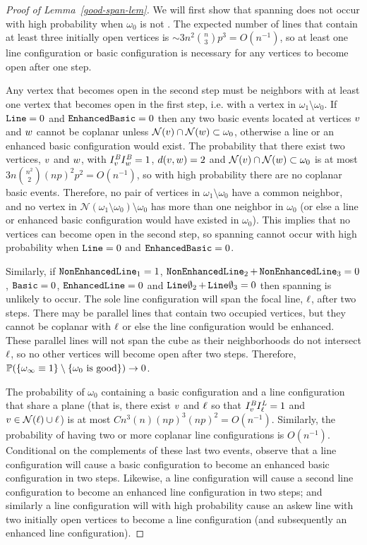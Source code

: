 \begin{proof}[Proof of Lemma~\ref{good-span-lem}]
We will first show that spanning does not occur with high probability when $\omega_0$ is not \good.  The expected number of lines that contain at least three initially open vertices is $\sim3n^2  {n \choose 3}p^3=O(n^{-1})$, so at least one line configuration or basic configuration is necessary for any vertices to become open after one step.  

Any vertex that becomes open in the second step must be neighbors with at least one vertex that becomes open in the first step, i.e. with a vertex in $\omega_1\setminus \omega_0$.  If $\operatorname{\tt Line} = 0$ and $\operatorname{\tt Enhanced Basic}=0$ then any two basic events located at vertices ${ v}$ and ${ w}$ cannot be coplanar unless $\mathcal{N}({ v})\cap \mathcal{N}({ w}) \subset \omega_0$, otherwise a line or an enhanced basic configuration would exist.  The probability that there exist two vertices, ${ v}$ and ${ w}$, with $I^{\text{\em B}}_{{ v}}I^{\text{\em B}}_{{ w}} = 1$, $d({ v},{ w})=2$ and $\mathcal{N}({ v})\cap \mathcal{N}({ w}) \subset \omega_0$ is at most $3n {n^2 \choose 2} (np)^2 p^2 = O(n^{-1})$, so with high probability there are no coplanar basic events.  Therefore, no pair of vertices in $\omega_1 \setminus \omega_0$ have a common neighbor, and no vertex in $\mathcal{N}(\omega_1 \setminus \omega_0) \setminus \omega_0$ has more than one neighbor in $\omega_0$ (or else a line or enhanced basic configuration would have existed in $\omega_0$).  This implies that no vertices can become open in the second step, so spanning cannot occur with high probability when $\operatorname{\tt Line} = 0$ and $\operatorname{\tt Enhanced Basic} = 0$.

Similarly, if $\operatorname{\tt NonEnhancedLine}_1 = 1$, $\operatorname{\tt NonEnhancedLine}_2+\operatorname{\tt NonEnhancedLine}_3=0$, $\operatorname{\tt Basic} = 0$, \newline $\operatorname{\tt Enhanced Line} = 0$ and $\operatorname{\tt Line\emptyset}_2 + \operatorname{\tt Line\emptyset}_3 = 0$ then spanning is unlikely to occur.  The sole line configuration will span the focal line, $\ell$, after two steps.  There may be parallel lines that contain two occupied vertices, but they cannot be coplanar with $\ell$ or else the line configuration would be enhanced.  These parallel lines will not span the cube as their neighborhoods do not intersect $\ell$, so no other vertices will become open after two steps.  Therefore,  $\mathbb{P}(\{\omega_\infty \equiv 1\} \setminus \{\omega_0 \text{ is } \text{good}\}) \to 0$.

The probability of $\omega_0$ containing a basic configuration and a line configuration that share a plane (that is, there exist ${ v}$ and $\ell$ so that $I^{\text{\em B}}_{{ v}} I^{\text{\em L}}_\ell=1$ and ${ v} \in \mathcal{N}(\ell)\cup \ell$) is at most $Cn^3 (n) (np)^3  (np)^2 = O(n^{-1})$.  Similarly, the probability of having two or more coplanar line configurations is $O(n^{-1})$.  Conditional on the complements of these last two events, observe that a line configuration will cause a basic configuration to become an enhanced basic configuration in two steps.  Likewise, a line configuration will cause a second line configuration to become an enhanced line configuration in two steps; and similarly a line configuration will with high probability cause an askew line with two initially open vertices to become a line configuration (and subsequently an enhanced line configuration).


\end{proof}
